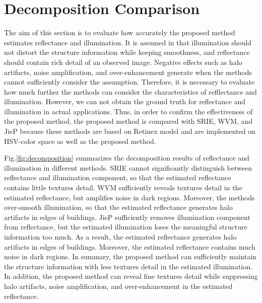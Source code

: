 \section{Decomposition Comparison} \label{sec:decomposition}
The aim of this section is to evaluate how accurately the proposed method estimates reflectance and illumination. It is assumed in \cite{retinex} that illumination should not distort the structure information while keeping smoothness, and reflectance should contain rich detail of an observed image. Negative effects such as halo artifacts, noise amplification, and over-enhancement generate when the methods cannot sufficiently consider the assumption. Therefore, it is necessary to evaluate how much further the methods can consider the characteristics of refllectance and illumination. However, we can not obtain the ground truth for reflectance and illumination in actual applications. Thus, in order to confirm the effectiveness of the proposed method, the proposed method is compared with SRIE, WVM, and JieP because these methods are based on Retinex model and are implemented on HSV-color space as well as the proposed method.\par
Fig.\ref{fig:decomposition} summarizes the decomposition results of reflectance and illumination in different methods. SRIE cannot significantly distinguish between reflectance and illumination component, so that the estimated reflectance contains little textures detail. WVM sufficiently reveals textures detail in the estimated reflectance, but amplifies noise in dark regions. Moreover, the methods over-smooth illumination, so that the estimated reflectance generates halo artifacts in edges of buildings. JieP sufficiently removes illumination component from reflectance, but the estimated illumination loses the meaningful structure information too much. As a result, the estimated reflectance generates halo artifacts in edges of buildings. Moreover, the estimated reflectance contains much noise in dark regions. In summary, the proposed method can sufficiently maintain the structure information with less textures detail in the estimated illumination. In addition, the proposed method can reveal fine textures detail while suppressing halo artifacts, noise amplification, and over-enhancement in the estimated reflectance.
